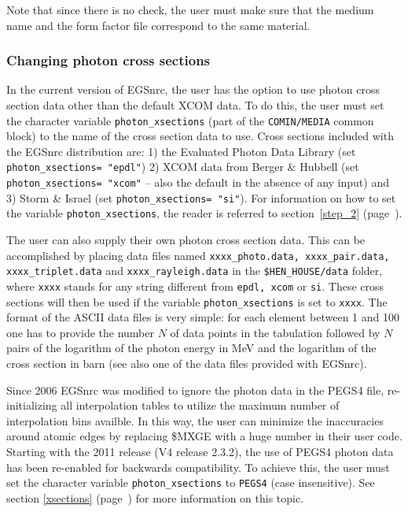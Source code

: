 Note that since there is no check, the user must make sure that the medium name and
the form factor file correspond to the same material.

\subsubsection{Changing photon cross sections}
\label{photon_xsect}

In the current version of EGSnrc, the user has the option to use
photon cross section data other than the default
XCOM data.  To do this, the user must
set the character variable {\tt photon\_xsections} (part of the
{\tt COMIN/MEDIA} common block) to the name of the cross section
data to use.  Cross sections included with the EGSnrc distribution
are: 1) the Evaluated Photon Data
Library\cite{Cu97a} (set {\tt photon\_xsections= "epdl"})
2) XCOM data from Berger \& Hubbell\cite{BH87} (set {\tt photon\_xsections= "xcom"}
-- also the default in the absence of any input)
and 3) Storm \& Israel\cite{SI70} (set {\tt photon\_xsections= "si"}). For information on how
to set the variable {\tt photon\_xsections}, the reader
is referred to section~\ref{step_2} (page~\pageref{photon_xsections_description}).

The user can also supply their own photon cross section data.
This can be accomplished by placing data files named
{\tt xxxx\_photo.data, xxxx\_pair.data, xxxx\_triplet.data} and {\tt xxxx\_rayleigh.data}
in the {\tt \$HEN\_HOUSE/data} folder, where {\tt xxxx} stands for any string different
from {\tt epdl, xcom} or {\tt si}. These cross sections will then be used if
the variable {\tt photon\_xsections} is set to {\tt xxxx}. The format of the
ASCII data files is very simple: for each element between 1 and 100 one has to
provide the number $N$ of data points in the tabulation followed by $N$
pairs of the logarithm of the photon energy in MeV and the logarithm of the
cross section in barn (see also one of the data files provided with EGSnrc).

Since 2006 EGSnrc was modified to ignore the photon data in the PEGS4
file, re-initializing all interpolation tables to utilize the
maximum number of interpolation bins availble. In this way, the user
can minimize the inaccuracies around atomic edges by replacing \$MXGE with
a huge number in their user code. Starting with the 2011 release
(V4 release 2.3.2), the use of PEGS4 photon data has been re-enabled for
backwards compatibility.
To achieve this, the user must set the character variable
{\tt photon\_xsections} to {\tt PEGS4} (case insensitive). See
section \ref{xsections} (page~\pageref{xsections}) for more
information on this topic.

